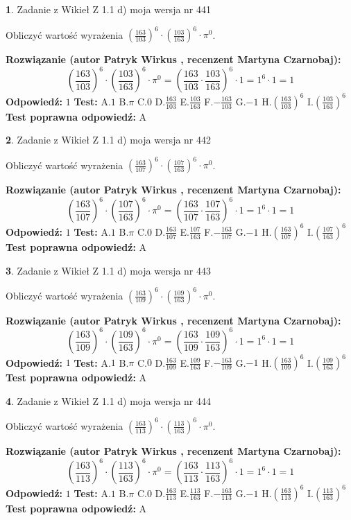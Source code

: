 \documentclass[12pt, a4paper]{article}
\theoremstyle{definition} %
\newtheorem{zad}{}
\newcommand{\zadStart}[1]{\begin{zad}#1\newline}
\newcommand{\zadStop}{\end{zad}}
\newcommand{\rozwStart}[2]{\noindent \textbf{Rozwiązanie (autor #1 , recenzent #2): }\newline}
\newcommand{\rozwStop}{\newline}
\newcommand{\odpStart}{\noindent \textbf{Odpowiedź:}\newline}
\newcommand{\odpStop}{\newline}
\newcommand{\testStart}{\noindent \textbf{Test:}\newline}
\newcommand{\testStop}{\newline}
\newcommand{\kluczStart}{\noindent \textbf{Test poprawna odpowiedź:}\newline}
\newcommand{\kluczStop}{\newline}
\begin{document}
\zadStart{Zadanie z Wikieł Z 1.1 d) moja wersja nr 441}

Obliczyć wartość wyrażenia $(\frac{163}{103})^{6} \cdot (\frac{103}{163})^{6} \cdot \pi^{0}$.
\zadStop
\rozwStart{Patryk Wirkus}{Martyna Czarnobaj}
$$(\frac{163}{103})^{6} \cdot (\frac{103}{163})^{6} \cdot \pi^{0} = (\frac{163}{103} \cdot \frac{103}{163})^{6} \cdot 1 = 1^{6} \cdot 1 = 1$$
\rozwStop
\odpStart
$1$
\odpStop
\testStart
A.$1$ B.$\pi$ C.$0$ D.$\frac{163}{103}$ E.$\frac{103}{163}$
F.$-\frac{163}{103}$ G.$-1$
H.$(\frac{163}{103})^{6}$
I.$(\frac{103}{163})^{6}$
\testStop
\kluczStart
A
\kluczStop



\zadStart{Zadanie z Wikieł Z 1.1 d) moja wersja nr 442}

Obliczyć wartość wyrażenia $(\frac{163}{107})^{6} \cdot (\frac{107}{163})^{6} \cdot \pi^{0}$.
\zadStop
\rozwStart{Patryk Wirkus}{Martyna Czarnobaj}
$$(\frac{163}{107})^{6} \cdot (\frac{107}{163})^{6} \cdot \pi^{0} = (\frac{163}{107} \cdot \frac{107}{163})^{6} \cdot 1 = 1^{6} \cdot 1 = 1$$
\rozwStop
\odpStart
$1$
\odpStop
\testStart
A.$1$ B.$\pi$ C.$0$ D.$\frac{163}{107}$ E.$\frac{107}{163}$
F.$-\frac{163}{107}$ G.$-1$
H.$(\frac{163}{107})^{6}$
I.$(\frac{107}{163})^{6}$
\testStop
\kluczStart
A
\kluczStop



\zadStart{Zadanie z Wikieł Z 1.1 d) moja wersja nr 443}

Obliczyć wartość wyrażenia $(\frac{163}{109})^{6} \cdot (\frac{109}{163})^{6} \cdot \pi^{0}$.
\zadStop
\rozwStart{Patryk Wirkus}{Martyna Czarnobaj}
$$(\frac{163}{109})^{6} \cdot (\frac{109}{163})^{6} \cdot \pi^{0} = (\frac{163}{109} \cdot \frac{109}{163})^{6} \cdot 1 = 1^{6} \cdot 1 = 1$$
\rozwStop
\odpStart
$1$
\odpStop
\testStart
A.$1$ B.$\pi$ C.$0$ D.$\frac{163}{109}$ E.$\frac{109}{163}$
F.$-\frac{163}{109}$ G.$-1$
H.$(\frac{163}{109})^{6}$
I.$(\frac{109}{163})^{6}$
\testStop
\kluczStart
A
\kluczStop



\zadStart{Zadanie z Wikieł Z 1.1 d) moja wersja nr 444}

Obliczyć wartość wyrażenia $(\frac{163}{113})^{6} \cdot (\frac{113}{163})^{6} \cdot \pi^{0}$.
\zadStop
\rozwStart{Patryk Wirkus}{Martyna Czarnobaj}
$$(\frac{163}{113})^{6} \cdot (\frac{113}{163})^{6} \cdot \pi^{0} = (\frac{163}{113} \cdot \frac{113}{163})^{6} \cdot 1 = 1^{6} \cdot 1 = 1$$
\rozwStop
\odpStart
$1$
\odpStop
\testStart
A.$1$ B.$\pi$ C.$0$ D.$\frac{163}{113}$ E.$\frac{113}{163}$
F.$-\frac{163}{113}$ G.$-1$
H.$(\frac{163}{113})^{6}$
I.$(\frac{113}{163})^{6}$
\testStop
\kluczStart
A
\kluczStop
\end{document}
